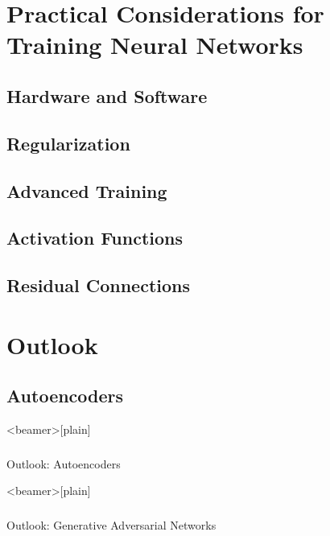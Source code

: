 \documentclass[13pt,compress]{beamer}
\begin{document}
\section{Practical Considerations for Training Neural Networks}
\subsection{Hardware and Software}

\subsection{Regularization}

\subsection{Advanced Training}

\subsection{Activation Functions}

\subsection{Residual Connections}

\section*{Outlook}
\subsection*{Autoencoders}
\begin{frame}<beamer>[plain]
    \frametitle{}
\begin{center}    
\Large{Outlook: Autoencoders}
\end{center}
  \end{frame}

\begin{frame}<beamer>[plain]
    \frametitle{}
\begin{center}    
\Large{Outlook: Generative  Adversarial Networks}
\end{center}
  \end{frame}
\end{document}
